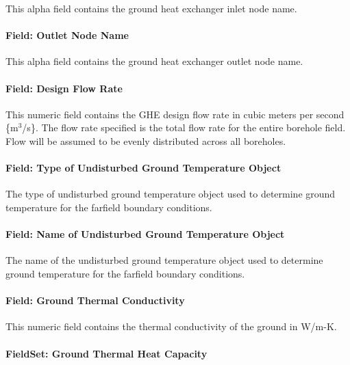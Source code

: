 This alpha field contains the ground heat exchanger inlet node name.

\paragraph{Field: Outlet Node Name}\label{field-outlet-node-name-001}

This alpha field contains the ground heat exchanger outlet node name.

\paragraph{Field: Design Flow Rate}\label{field-design-flow-rate-000}

This numeric field contains the GHE design flow rate in cubic meters per second \{m\(^{3}\)/s\}. The flow rate specified is the total flow rate for the entire borehole field. Flow will be assumed to be evenly distributed across all boreholes.

\paragraph{Field: Type of Undisturbed Ground Temperature Object}\label{field-type-of-undisturbed-ground-temperature-object}

The type of undisturbed ground temperature object used to determine ground temperature for the farfield boundary conditions.

\paragraph{Field: Name of Undisturbed Ground Temperature Object}\label{field-name-of-undisturbed-ground-temperature-object}

The name of the undisturbed ground temperature object used to determine ground temperature for the farfield boundary conditions.

\paragraph{Field: Ground Thermal Conductivity}\label{field-ground-thermal-conductivity}

This numeric field contains the thermal conductivity of the ground in W/m-K.

\paragraph{FieldSet: Ground Thermal Heat Capacity}\label{fieldset-ground-thermal-heat-capacity}

